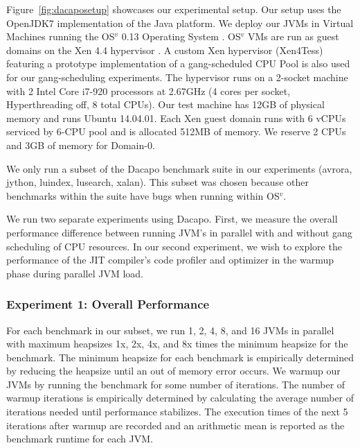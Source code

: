 \documentclass{sig-alternate}
\begin{document}
Figure~\ref{fig:dacaposetup} showcases our experimental setup. Our setup uses the OpenJDK7 implementation of the Java platform. We deploy our JVMs in Virtual Machines running the OS$^{v}$ 0.13 Operating System \cite{aviOSv2014}. OS$^{v}$ VMs are run as guest domains on the Xen 4.4 hypervisor \cite{barham2003xen}. A custom Xen hypervisor (Xen4Tess) featuring a prototype implementation of a gang-scheduled CPU Pool is also used for our gang-scheduling experiments. The hypervisor runs on a 2-socket machine with 2 Intel Core i7-920 processors at 2.67GHz (4 cores per socket, Hyperthreading off,  8 total CPUs). Our test machine has 12GB of physical memory and runs Ubuntu 14.04.01. Each Xen guest domain runs with 6 vCPUs serviced by 6-CPU pool and is allocated 512MB of memory. We reserve 2 CPUs and 3GB of memory for Domain-0.  

We only run a subset of the Dacapo benchmark suite in our experiments (avrora, jython, luindex, lusearch, xalan). This subset was chosen because other benchmarks within the suite have bugs when running within OS$^{v}$.

We run two separate experiments using Dacapo. First, we measure the overall performance difference between running JVM's in parallel with and without gang scheduling of CPU resources. In our second experiment, we wish to explore the performance of the JIT compiler's code profiler and optimizer in the warmup phase during parallel JVM load.


\subsubsection{Experiment 1: Overall Performance}
For each benchmark in our subset, we run 1, 2, 4, 8, and 16 JVMs in parallel with maximum heapsizes 1x, 2x, 4x, and 8x times the minimum heapsize for the benchmark. The minimum heapsize for each benchmark is empirically determined by reducing the heapsize until an out of memory error occurs. We warmup our JVMs by running the benchmark for some number of iterations. The number of warmup iterations is empirically determined by calculating the average number of iterations needed until performance stabilizes. The execution times of the next 5 iterations after warmup are recorded and an arithmetic mean is reported as the benchmark runtime for each JVM. 

\end{document}
